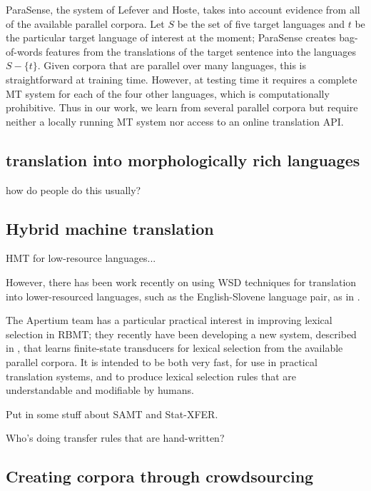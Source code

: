 ParaSense, the system of Lefever
and Hoste, takes into account evidence from all of the available parallel
corpora. Let $S$ be the set of five target languages and $t$ be the particular
target language of interest at the moment; ParaSense creates bag-of-words
features from the translations of the target sentence into the languages $S -
\lbrace{t \rbrace}$.
Given corpora that are parallel over many languages, this is straightforward at
training time. However, at testing time it requires a complete MT system for
each of the four other languages, which is computationally prohibitive. Thus in
our work, we learn from several parallel corpora but require neither a locally
running MT system nor access to an online translation API.



\subsection{translation into morphologically rich languages}

how do people do this usually?


\subsection{Hybrid machine translation}
HMT for low-resource languages...

However, there has been work recently on using WSD techniques for translation
into lower-resourced languages, such as the English-Slovene language pair, as
in \cite{vintar-fivser-vrvsvcaj:2012:ESIRMT-HyTra2012}. 

The Apertium team has a particular practical interest in improving lexical
selection in RBMT; they recently have been developing
a new system, described in \cite{tyers-fst}, that learns finite-state
transducers for lexical selection from the available parallel corpora. It is
intended to be both very fast, for use in practical translation systems, and
to produce lexical selection rules that are understandable and modifiable by
humans.

Put in some stuff about SAMT and Stat-XFER.

Who's doing transfer rules that are hand-written?

\subsection{Creating corpora through crowdsourcing}


